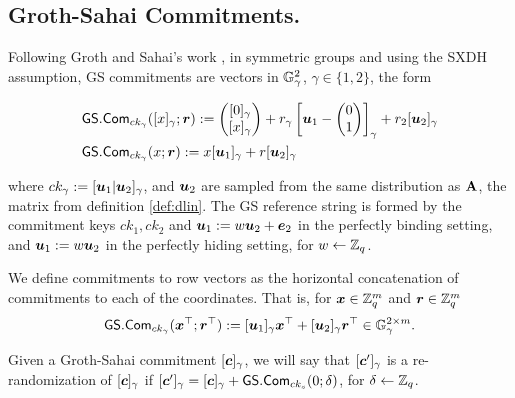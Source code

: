 \subsection{Groth-Sahai Commitments.}
Following Groth and Sahai's work \cite{EC:GroSah08}, in symmetric groups and using the SXDH assumption, GS commitments are vectors in $\mathbb{G}^2_\gamma$, $\gamma\in\{1,2\}$, the form
\begin{small}\begin{align*}
&{\mathsf{GS}}.\mathsf{Com}_{ck_\gamma}([x]_\gamma;{\boldsymbol{r}}):=\left(\begin{matrix}{[0]_\gamma}\\{[x]_\gamma}\end{matrix}\right)+r_\gamma\left[{\boldsymbol{u}}_1-\left(\begin{matrix}0\\1\end{matrix}\right)\right]_\gamma+{r}_2[{\boldsymbol{u}}_2]_\gamma\\
&{\mathsf{GS}}.\mathsf{Com}_{ck_\gamma}(x;{\boldsymbol{r}}):=x[{\boldsymbol{u}}_1]_\gamma+{r}[{\boldsymbol{u}}_2]_\gamma
\end{align*}\end{small}
where $ck_\gamma:=[{\boldsymbol{u}}_1|{\boldsymbol{u}}_2]_\gamma$, and ${\boldsymbol{u}}_2$ are sampled from the same distribution as $\mathbf{{A}}$, the matrix from definition \ref{def:dlin}. The GS reference string is formed by the commitment keys $ck_1,ck_2$  and ${\boldsymbol{u}}_1:=w{\boldsymbol{u}}_2+{\boldsymbol{e}}_2$ in the perfectly binding setting, and ${\boldsymbol{u}}_1:=w{\boldsymbol{u}}_2$ in the perfectly hiding setting, for $w\gets\mathbb{Z}_q$.

We define commitments to row vectors as the horizontal concatenation of commitments to each of the coordinates. That is, for ${\boldsymbol{x}}\in\mathbb{Z}_q^m$ and ${\boldsymbol{r}}\in\mathbb{Z}_q^m$
\begin{align*}
{\mathsf{GS}}.\mathsf{Com}_{ck_\gamma}({\boldsymbol{x}}^\top;{\boldsymbol{r}}^\top) := [{\boldsymbol{u}}_1]_\gamma{\boldsymbol{x}}^\top+[{\boldsymbol{u}}_2]_\gamma{\boldsymbol{r}}^\top\in\mathbb{G}_\gamma^{2\times m}.
\end{align*}

Given a Groth-Sahai commitment $[{\boldsymbol{c}}]_\gamma$, we will say that $[{\boldsymbol{c}}']_\gamma$ is a re-randomization of $[{\boldsymbol{c}}]_\gamma$ if $[{\boldsymbol{c}}']_\gamma = [{\boldsymbol{c}}]_\gamma + {\mathsf{GS}}.\mathsf{Com}_{ck_s}(0;\delta)$, for $\delta\gets\mathbb{Z}_q$.
